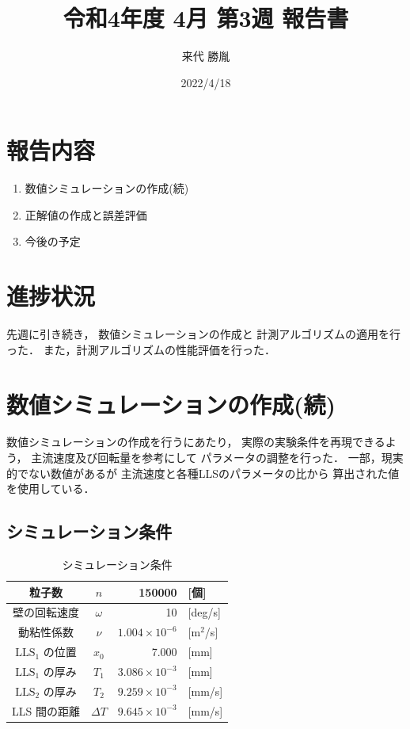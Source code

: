 \documentclass[twocolumn,a4j]{jsarticle}
\author{来代 勝胤}
\title{令和4年度 4月 第3週 報告書}
\date{2022/4/18}
\begin{document}
\columnseprule=0.1mm
\maketitle

\section*{報告内容}
\begin{enumerate}[1.]
  \item 数値シミュレーションの作成(続)
  \item 正解値の作成と誤差評価
  \item 今後の予定
\end{enumerate}

\section*{進捗状況}
先週に引き続き，
数値シミュレーションの作成と
計測アルゴリズムの適用を行った．
また，計測アルゴリズムの性能評価を行った．

\section{数値シミュレーションの作成(続)}
数値シミュレーションの作成を行うにあたり，
実際の実験条件を再現できるよう，
主流速度及び回転量を参考にして
パラメータの調整を行った．
一部，現実的でない数値があるが
主流速度と各種LLSのパラメータの比から
算出された値を使用している．\\

\subsection{シミュレーション条件}
\begin{table}[hbtp]
  \label{table:data_type}
  \caption{シミュレーション条件}
  \centering
  \begin{tabular}{ c c | r l}
    \hline
    粒子数                  & $n$        & 150000                 & [個]               \\ \hline
    壁の回転速度            & $\omega$   & 10                     & [deg/s]            \\ \hline
    動粘性係数              & $\nu$      & $1.004 \times 10^{-6}$ & [$\mathrm{m}^2$/s] \\ \hline
    $\mathrm{LLS}_1$ の位置 & $x_0$      & 7.000                  & [mm]               \\ \hline
    $\mathrm{LLS}_1$ の厚み & $T_1$      & $3.086\times 10^{-3}$  & [mm]               \\ \hline
    $\mathrm{LLS}_2$ の厚み & $T_2$      & $9.259\times 10^{-3}$  & [mm/s]             \\ \hline
    LLS 間の距離            & $\Delta T$ & $9.645\times 10^{-3}$  & [mm/s]             \\ \hline
  \end{tabular}
\end{table}
\end{document}
